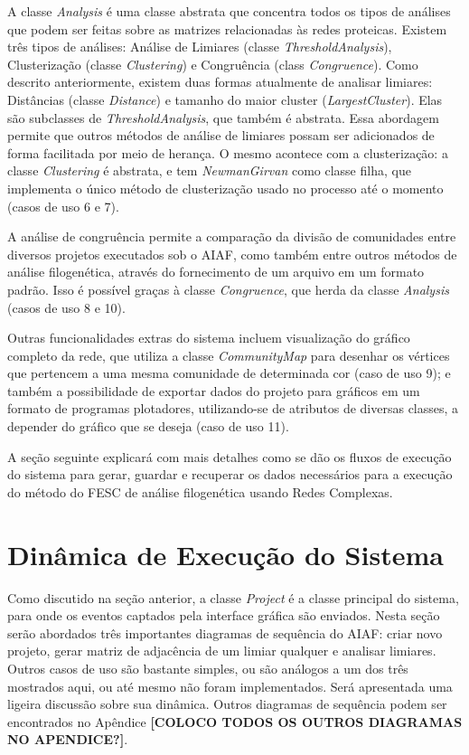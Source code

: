 A classe \textit{Analysis} é uma classe abstrata que concentra todos os tipos de análises que podem ser feitas sobre as matrizes relacionadas às redes
proteicas. Existem três tipos de análises: Análise de Limiares (classe \textit{ThresholdAnalysis}), Clusterização (classe \textit{Clustering}) e
Congruência (class \textit{Congruence}). Como descrito anteriormente, existem duas formas atualmente de analisar limiares: Distâncias (classe
\textit{Distance}) e tamanho do maior cluster (\textit{LargestCluster}). Elas são subclasses de \textit{ThresholdAnalysis}, que também é abstrata. Essa
abordagem permite que outros métodos de análise de limiares possam ser adicionados de forma facilitada por meio de herança. O mesmo acontece com a
clusterização: a classe \textit{Clustering} é abstrata, e tem \textit{NewmanGirvan} como classe filha, que implementa o único método de clusterização
usado no processo até o momento (casos de uso 6 e 7).

A análise de congruência permite a comparação da divisão de comunidades entre diversos projetos executados sob o AIAF, como também entre outros métodos de
análise filogenética, através do fornecimento de um arquivo em um formato padrão. Isso é possível graças à classe \textit{Congruence}, que herda da classe
\textit{Analysis} (casos de uso 8 e 10).

Outras funcionalidades extras do sistema incluem visualização do gráfico completo da rede, que utiliza a classe \textit{CommunityMap} para desenhar
os vértices que pertencem a uma mesma comunidade de determinada cor (caso de uso 9); e também a possibilidade de exportar dados do projeto para
gráficos em um formato de programas plotadores, utilizando-se de atributos de diversas classes, a depender do gráfico que se deseja (caso de uso 11).

A seção seguinte explicará com mais detalhes como se dão os fluxos de execução do sistema para gerar, guardar e recuperar os dados necessários para a
execução do método do FESC de análise filogenética usando Redes Complexas.

\section{Dinâmica de Execução do Sistema} \label{sec:dinamica}

Como discutido na seção anterior, a classe \textit{Project} é a classe principal do sistema, para onde os eventos captados pela interface gráfica são
enviados. Nesta seção serão abordados três importantes diagramas de sequência do AIAF: criar novo projeto, gerar matriz de adjacência de um limiar qualquer
e analisar limiares. Outros casos de uso são bastante simples, ou são análogos a um dos três mostrados aqui, ou até mesmo não foram implementados. Será
apresentada uma ligeira discussão sobre sua dinâmica. Outros diagramas de sequência podem ser encontrados no Apêndice \textbf{[COLOCO TODOS OS OUTROS
DIAGRAMAS NO APENDICE?]}.

